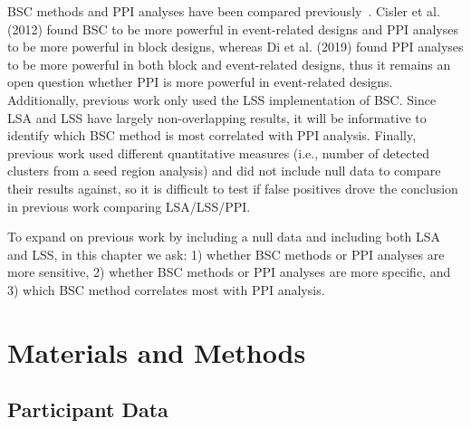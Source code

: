 \documentclass[phd,figures,tables,ackpage,abstractpage,publicabstractpage]{uithesis}
\begin{document}
BSC methods and PPI analyses have been compared previously~\cite{Cisler2012,Di2019}.
Cisler et al. (2012) found BSC to be more powerful in event-related designs
and PPI analyses to be more powerful in block designs, whereas Di et al. (2019)
found PPI analyses to be more powerful in both block and event-related designs,
thus it remains an open question whether PPI is more powerful in
event-related designs.
Additionally, previous work only used the LSS implementation of BSC.
Since LSA and LSS have largely non-overlapping results, it will be informative
to identify which BSC method is most correlated with PPI analysis.
Finally, previous work used different quantitative measures
(i.e., number of detected clusters from a seed region analysis)
and did not include null data to compare their results against, so it is
difficult to test if false positives drove the
conclusion in previous work comparing LSA/LSS/PPI.

To expand on previous work by including a null data and
including both LSA and LSS, in this chapter we ask:
1) whether BSC methods or PPI analyses are more sensitive,
2) whether BSC methods or PPI analyses are more specific, and
3) which BSC method correlates most with PPI analysis.

\section{Materials and Methods}

\subsection{Participant Data}
\label{methods:task-switch2}
\end{document}
